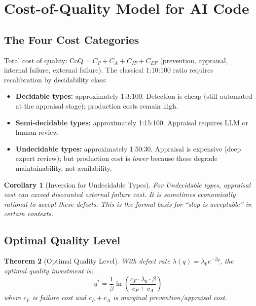 \documentclass[11pt, a4paper]{article}
\newtheorem{theorem}{Theorem}[section]
\newtheorem{corollary}[theorem]{Corollary}
\theoremstyle{definition}
\theoremstyle{remark}
\newcommand{\CoQ}{\mathrm{CoQ}}
\begin{document}
\section{Cost-of-Quality Model for AI Code}
\label{sec:coq}

\subsection{The Four Cost Categories}

Total cost of quality: $\CoQ = C_P + C_A + C_{IF} + C_{EF}$ (prevention, appraisal, internal failure, external failure). The classical 1:10:100 ratio requires recalibration by decidability class:

\begin{itemize}[leftmargin=2em]
\item \textbf{Decidable types:} approximately 1:3:100. Detection is cheap (still automated at the appraisal stage); production costs remain high.
\item \textbf{Semi-decidable types:} approximately 1:15:100. Appraisal requires LLM or human review.
\item \textbf{Undecidable types:} approximately 1:50:30. Appraisal is expensive (deep expert review); but production cost is \emph{lower} because these degrade maintainability, not availability.
\end{itemize}

\begin{corollary}[Inversion for Undecidable Types]
For Undecidable types, appraisal cost can exceed discounted external failure cost. It is sometimes economically rational to \emph{accept} these defects. This is the formal basis for ``slop is acceptable'' in certain contexts.
\end{corollary}

\subsection{Optimal Quality Level}

\begin{theorem}[Optimal Quality Level]
\label{thm:optquality}
With defect rate $\lambda(q) = \lambda_0 e^{-\beta q}$, the optimal quality investment is:
\begin{equation}
q^* = \frac{1}{\beta} \ln\!\left(\frac{c_F \cdot \lambda_0 \cdot \beta}{c_P + c_A}\right)
\end{equation}
where $c_F$ is failure cost and $c_P + c_A$ is marginal prevention/appraisal cost.
\end{theorem}
\end{document}
